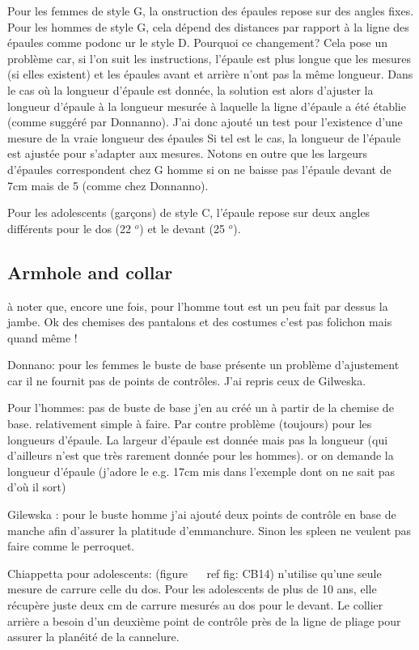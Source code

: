 \documentclass[11pt,a4paper]{report}
\begin{document}
Pour les femmes de style G, la  onstruction des épaules repose sur des angles fixes. Pour les hommes de style G, cela dépend des distances par rapport à la ligne des épaules comme podonc ur le style D. Pourquoi ce changement? Cela pose un problème car, si l'on suit les instructions, l'épaule est plus longue que les mesures (si elles existent) et les épaules avant et arrière n'ont pas la même longueur. Dans le cas où la longueur d'épaule est donnée, la solution est alors d'ajuster la longueur d'épaule à la longueur mesurée à laquelle la ligne d'épaule a été établie (comme suggéré par Donnanno). J'ai donc ajouté un test pour l'existence d'une mesure de la vraie longueur des épaules Si tel est le cas, la longueur de l'épaule est ajustée pour s'adapter aux mesures. Notons en outre que les largeurs d'épaules correspondent chez G homme si on ne baisse pas l'épaule devant de 7cm mais de 5 (comme chez Donnanno).


Pour les adolescents (garçons) de style C, l'épaule repose sur deux angles différents pour le dos (22 $ ^ o $) et le devant (25 $ ^ o $).



\subsection{Armhole and collar}

à noter que, encore une fois, pour l'homme tout est un peu fait par dessus
la jambe. Ok des chemises des pantalons et des costumes c'est pas
folichon mais quand même !

Donnano:  pour les femmes le buste de base présente un problème d'ajustement car il ne
fournit pas de points de contrôles. J'ai repris ceux de Gilweska.

Pour l'hommes: pas de buste de base j'en au  créé un à partir de la chemise de base.
relativement simple à faire. Par contre problème (toujours) pour les
longueurs d'épaule. La largeur d'épaule est donnée mais pas la
longueur (qui d'ailleurs n'est que très rarement donnée pour les
hommes). or on demande la longueur d'épaule (j'adore le e.g. 17cm mis
dans l'exemple dont on ne sait pas d'où il sort)

Gilewska : pour le buste homme j'ai ajouté  deux points de contrôle
en base de manche  afin d'assurer la platitude d'emmanchure. Sinon les
spleen ne veulent pas faire comme le perroquet.


Chiappetta pour adolescents: (figure ~ \ ref {fig: CB14}) n'utilise qu'une seule mesure de carrure celle du dos. Pour les adolescents de plus de 10 ans, elle récupère juste deux cm de carrure mesurés au dos pour le devant. Le collier arrière a besoin d'un deuxième point de contrôle près de la ligne de pliage pour assurer la planéité de la cannelure.
\end{document}
